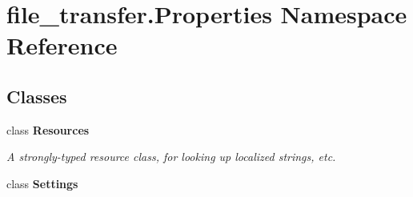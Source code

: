 \hypertarget{namespacefile__transfer_1_1_properties}{}\section{file\+\_\+transfer.\+Properties Namespace Reference}
\label{namespacefile__transfer_1_1_properties}
\subsection*{Classes}
\begin{DoxyCompactItemize}
\item 
class {\bfseries Resources}
\begin{DoxyCompactList}\small\item\em A strongly-\/typed resource class, for looking up localized strings, etc. \end{DoxyCompactList}\item 
class {\bfseries Settings}
\end{DoxyCompactItemize}
